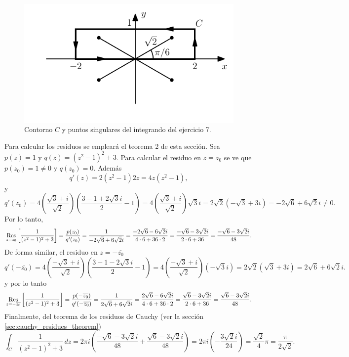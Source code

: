 \documentclass[a4paper]{report}
\def\Res{\qopname\relax m{Res}}
\begin{document}
\begin{figure}[!htb]
  \begin{minipage}[c]{0.5\textwidth}
    \includegraphics[width=\textwidth]{figuras/exercise_83_07.pdf}
  \end{minipage}\hfill
  \begin{minipage}[c]{0.4\textwidth}
    \caption{
       Contorno \(C\) y puntos singulares del integrando del ejercicio 7.
    }\label{fig:exercise_83_07}
  \end{minipage}
\end{figure}

Para calcular los residuos se empleará el teorema 2 de esta sección. Sea \(p(z)=1\) y \(q(z)=(z^2-1)^2+3\). Para calcular el residuo en \(z=z_0\) se ve que \(p(z_0)=1\neq0\) y \(q(z_0)=0\). Además
\[
 q'(z)=2(z^2-1)2z=4z(z^2-1),
\]
y
\[
 q'(z_0)=4\left(\frac{\sqrt{3}+i}{\sqrt{2}}\right)\left(\frac{3-1+2\sqrt{3}i}{2}-1\right)
  =4\left(\frac{\sqrt{3}+i}{\sqrt{2}}\right)\sqrt{3}i
  =2\sqrt{2}(-\sqrt{3}+3i)=-2\sqrt{6}+6\sqrt{2}i\neq0.
\]
Por lo tanto,
\[
 \Res_{z=z_0}\left[\frac{1}{(z^2-1)^2+3}\right]=\frac{p(z_0)}{q'(z_0)}=\frac{1}{-2\sqrt{6}+6\sqrt{2}i}
  =\frac{-2\sqrt{6}-6\sqrt{2}i}{4\cdot6+36\cdot2}
  =\frac{-\sqrt{6}-3\sqrt{2}i}{2\cdot6+36}
  =\frac{-\sqrt{6}-3\sqrt{2}i}{48}.
\]
De forma similar, el residuo en \(z=-\overline{z_0}\)
\[
 q'(-\overline{z_0})=4\left(\frac{-\sqrt{3}+i}{\sqrt{2}}\right)\left(\frac{3-1-2\sqrt{3}i}{2}-1\right)
  =4\left(\frac{-\sqrt{3}+i}{\sqrt{2}}\right)(-\sqrt{3}i)
  =2\sqrt{2}(\sqrt{3}+3i)=2\sqrt{6}+6\sqrt{2}i.
\]
y por lo tanto
\[
 \Res_{z=-\overline{z_0}}\left[\frac{1}{(z^2-1)^2+3}\right]=\frac{p(-\overline{z_0})}{q'(-\overline{z_0})}
  =\frac{1}{2\sqrt{6}+6\sqrt{2}i}
  =\frac{2\sqrt{6}-6\sqrt{2}i}{4\cdot6+36\cdot2}
  =\frac{\sqrt{6}-3\sqrt{2}i}{2\cdot6+36}
  =\frac{\sqrt{6}-3\sqrt{2}i}{48}.
\]
Finalmente, del teorema de los residuos de Cauchy (ver la sección \ref{sec:cauchy_residues_theorem})
\[
 \int_C\frac{1}{(z^2-1)^2+3}\,dz=2\pi i\left(\frac{-\sqrt{6}-3\sqrt{2}i}{48}+\frac{\sqrt{6}-3\sqrt{2}i}{48}\right)=2\pi i\left(-\frac{3\sqrt{2}i}{24}\right)=\frac{\sqrt{2}}{4}\pi=\frac{\pi}{2\sqrt{2}}.
\]
\end{document}
